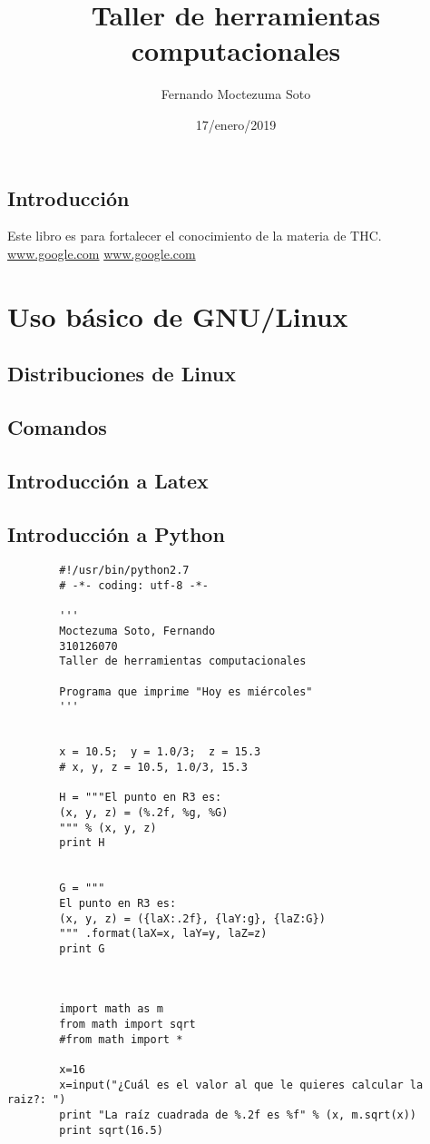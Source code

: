 \documentclass{book}
\title{Taller de herramientas computacionales}
\author{Fernando Moctezuma Soto}
\date{17/enero/2019}
\begin{document}
	
	\maketitle
	\tableofcontents
	\section*{Introducción} Este libro es para fortalecer el conocimiento de la materia de THC.
	\url{www.google.com}
	\hyperref[Google]{www.google.com}
	
	\chapter{Uso básico de GNU/Linux}
	\section{Distribuciones de Linux}
	\section{Comandos}
	\section{Introducción a Latex}
	\section{Introducción a Python}
	
	
	\begin{verbatim}
		#!/usr/bin/python2.7
		# -*- coding: utf-8 -*-
		
		'''
		Moctezuma Soto, Fernando
		310126070
		Taller de herramientas computacionales
		
		Programa que imprime "Hoy es miércoles"
		'''
		
		
		x = 10.5;  y = 1.0/3;  z = 15.3
		# x, y, z = 10.5, 1.0/3, 15.3
		
		H = """El punto en R3 es:
		(x, y, z) = (%.2f, %g, %G)
		""" % (x, y, z)
		print H
		
		
		G = """
		El punto en R3 es:
		(x, y, z) = ({laX:.2f}, {laY:g}, {laZ:G})
		""" .format(laX=x, laY=y, laZ=z)
		print G
		
		
		
		import math as m
		from math import sqrt 
		#from math import *
		
		x=16
		x=input("¿Cuál es el valor al que le quieres calcular la raiz?: ")
		print "La raíz cuadrada de %.2f es %f" % (x, m.sqrt(x))
		print sqrt(16.5)
	\end{verbatim}
	
\end{document}
